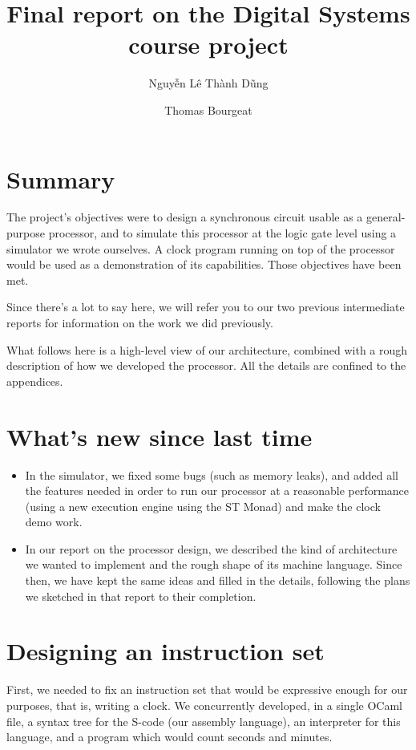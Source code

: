 \documentclass[a4paper, 11pt]{article}
\begin{document}
\title{Final report on the Digital Systems course project}
\author{Nguyễn Lê Thành Dũng \and Thomas Bourgeat}

\maketitle

\section{Summary}

The project's objectives were to design a synchronous circuit usable as a general-purpose processor, and to simulate this processor at the logic gate level using a simulator we wrote ourselves. A clock program running on top of the processor would be used as a demonstration of its capabilities. Those objectives have been met.

Since there's a lot to say here, we will refer you to our two previous intermediate reports for information on the work we did previously.

What follows here is a high-level view of our architecture, combined with a rough description of how we developed the processor. All the details are confined to the appendices.

\section{What's new since last time}

\begin{itemize}
\item In the simulator, we fixed some bugs (such as memory leaks), and added all the features needed in order to run our processor at a reasonable performance (using a new execution engine using the ST Monad) and make the clock demo work.
\item In our report on the processor design, we described the kind of architecture we wanted to implement and the rough shape of its machine language. Since then, we have kept the same ideas and filled in the details, following the plans we sketched in that report to their completion.
\end{itemize}

\section{Designing an instruction set}

First, we needed to fix an instruction set that would be expressive enough for our purposes, that is, writing a clock. We concurrently developed, in a single OCaml file, a syntax tree for the S-code (our assembly language), an interpreter for this language, and a program which would count seconds and minutes. 
\end{document}

